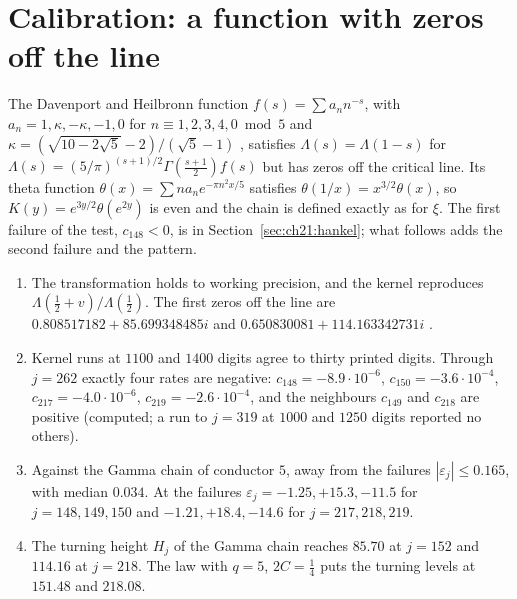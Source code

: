 \section{Calibration: a function with zeros off the line}\label{b:sec:dh}

The Davenport and Heilbronn function $f(s)=\sum a_nn^{-s}$, with $a_n=1,\kappa,-\kappa,-1,0$ for $n\equiv1,2,3,4,0 \bmod 5$ and $\kappa=(\sqrt{10-2\sqrt5}-2)/(\sqrt5-1)$ \cite{DH36}, satisfies $\Lambda(s)=\Lambda(1-s)$ for $\Lambda(s)=(5/\pi)^{(s+1)/2}\Gamma(\frac{s+1}{2})f(s)$ but has zeros off the critical line. Its theta function $\theta(x)=\sum na_ne^{-\pi n^2x/5}$ satisfies $\theta(1/x)=x^{3/2}\theta(x)$, so $K(y)=e^{3y/2}\theta(e^{2y})$ is even and the chain is defined exactly as for $\xi$. The first failure of the test, $c_{148}<0$, is in Section~\ref{sec:ch21:hankel}; what follows adds the second failure and the pattern.

\begin{remark}\label{b:comp:dh}
\begin{enumerate}
\item The transformation holds to working precision, and the kernel reproduces $\Lambda(\frac12+v)/\Lambda(\frac12)$. The first zeros off the line are $0.808517182+85.699348485i$ and $0.650830081+114.163342731i$ \cite{Spira94,BSO07}.
\item Kernel runs at $1100$ and $1400$ digits agree to thirty printed digits. Through $j=262$ exactly four rates are negative: $c_{148}=-8.9\cdot10^{-6}$, $c_{150}=-3.6\cdot10^{-4}$, $c_{217}=-4.0\cdot10^{-6}$, $c_{219}=-2.6\cdot10^{-4}$, and the neighbours $c_{149}$ and $c_{218}$ are positive (computed; a run to $j=319$ at $1000$ and $1250$ digits reported no others).
\item Against the Gamma chain of conductor $5$, away from the failures $|\varepsilon_j|\le0.165$, with median $0.034$. At the failures $\varepsilon_j=-1.25,+15.3,-11.5$ for $j=148,149,150$ and $-1.21,+18.4,-14.6$ for $j=217,218,219$.
\item The turning height $H_j$ of the Gamma chain reaches $85.70$ at $j=152$ and $114.16$ at $j=218$. The law with $q=5$, $2C=\frac14$ puts the turning levels at $151.48$ and $218.08$.
\end{enumerate}
\end{remark}

